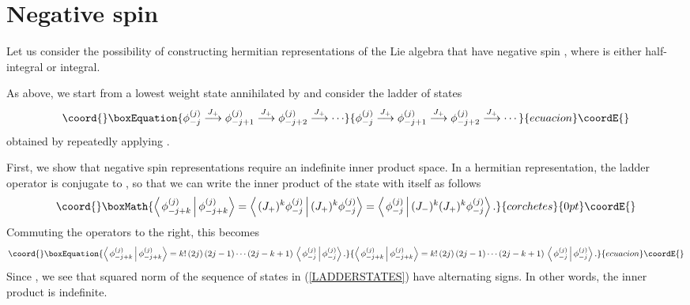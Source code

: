 \documentclass[a4paper,dvips,12pt]{article}
\providecommand {\braket}[2] {\left< { \left. #1 \,\right|} \,#2 \right>}
\begin{document}
    \section{Negative spin}

    Let us consider the possibility of constructing hermitian representations
    of the \coordHE{} Lie algebra that have negative spin \coordHE{}, where \coordHE{} is either
    half-integral or integral.

    As above, we start from a lowest weight state
    \coordHE{} annihilated by \coordHE{}
    and consider the ladder of states
    \begin{equation}\coord{}\boxEquation{
        \phi_{-j}^{(j)} \stackrel{J_+}{\longrightarrow} \phi_{-j+1}^{(j)}
        \stackrel{J_+}{\longrightarrow}
        \phi_{-j+2}^{(j)} \stackrel{J_+}{\longrightarrow} \cdots \label{LADDERSTATES}
    }{
        \phi_{-j}^{(j)} \stackrel{J_+}{\longrightarrow} \phi_{-j+1}^{(j)}
        \stackrel{J_+}{\longrightarrow}
        \phi_{-j+2}^{(j)} \stackrel{J_+}{\longrightarrow} \cdots }{ecuacion}\coordE{}\end{equation}
    obtained by repeatedly applying \coordHE{}.

    First, we show that negative
    spin representations require an indefinite inner product space.
    In a hermitian representation, the ladder
    operator \coordHE{} is conjugate to \coordHE{}, so that we can
    write the inner product of the state \coordHE{} with
    itself as follows
    \[\coord{}\boxMath{
      \braket{\phi_{-j + k}^{(j)}} {\phi_{-j + k}^{(j)}} =
        \braket {(J_+)^k \phi_{-j}^{(j)}}
        {(J_+)^k \phi_{-j}^{(j)}}
        = \braket{\phi_{-j}^{(j)}}
        {(J_-)^k(J_+)^k \phi_{-j}^{(j)}}.
    }{corchetes}{0pt}\coordE{}\]
    Commuting the \coordHE{} operators to the right, this becomes
    \begin{equation}\coord{}\boxEquation{
        \braket{\phi_{-j + k}^{(j)}} {\phi_{-j + k}^{(j)}}
        = k! \, (2j)\,(2j - 1)\cdots(2j-k+1)\,
        \braket{\phi_{-j}^{(j)}}
        {\phi_{-j}^{(j)}}.
    }{
        \braket{\phi_{-j + k}^{(j)}} {\phi_{-j + k}^{(j)}}
        = k! \, (2j)\,(2j - 1)\cdots(2j-k+1)\,
        \braket{\phi_{-j}^{(j)}}
        {\phi_{-j}^{(j)}}.
    }{ecuacion}\coordE{}\end{equation}
    Since \coordHE{}, we see that squared norm of
    the sequence of states in (\ref{LADDERSTATES})
    have alternating signs.
    In other words, the inner product is indefinite.
\end{document}
